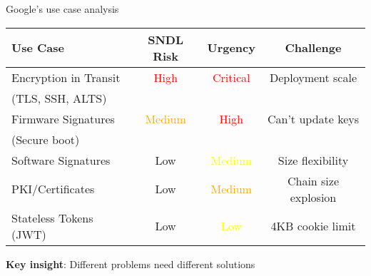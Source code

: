 \documentclass[aspectratio=169, lualatex, handout]{beamer}
\begin{document}
\begin{frame}{Google's use case analysis}
	\begin{center}
		\begin{tabular}{|l|c|c|c|}
			\hline
			\textbf{Use Case}      & \textbf{SNDL Risk}              & \textbf{Urgency}           & \textbf{Challenge}   \\
			\hline
			\hline
			Encryption in Transit  & \textcolor{red}{High}           & \textcolor{red}{Critical}  & Deployment scale     \\
			(TLS, SSH, ALTS)       &                                 &                            &                      \\
			\hline
			Firmware Signatures    & \textcolor{orange}{Medium}      & \textcolor{red}{High}      & Can't update keys    \\
			(Secure boot)          &                                 &                            &                      \\
			\hline
			Software Signatures    & \textcolor{green!70!black}{Low} & \textcolor{yellow}{Medium} & Size flexibility     \\
			\hline
			PKI/Certificates       & \textcolor{green!70!black}{Low} & \textcolor{orange}{Medium} & Chain size explosion \\
			\hline
			Stateless Tokens (JWT) & \textcolor{green!70!black}{Low} & \textcolor{yellow}{Low}    & 4KB cookie limit     \\
			\hline
		\end{tabular}
	\end{center}
	\vspace{3mm}
	\textbf{Key insight}: Different problems need different solutions
\end{frame}
\end{document}
